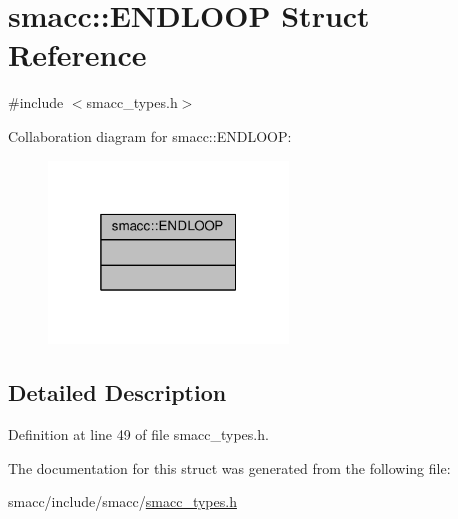 \hypertarget{structsmacc_1_1ENDLOOP}{}\section{smacc\+:\+:E\+N\+D\+L\+O\+OP Struct Reference}
\label{structsmacc_1_1ENDLOOP}


{\ttfamily \#include $<$smacc\+\_\+types.\+h$>$}



Collaboration diagram for smacc\+:\+:E\+N\+D\+L\+O\+OP\+:
\nopagebreak
\begin{figure}[H]
\begin{center}
\leavevmode
\includegraphics[width=181pt]{structsmacc_1_1ENDLOOP__coll__graph}
\end{center}
\end{figure}


\subsection{Detailed Description}


Definition at line 49 of file smacc\+\_\+types.\+h.



The documentation for this struct was generated from the following file\+:\begin{DoxyCompactItemize}
\item 
smacc/include/smacc/\hyperlink{smacc__types_8h}{smacc\+\_\+types.\+h}\end{DoxyCompactItemize}
